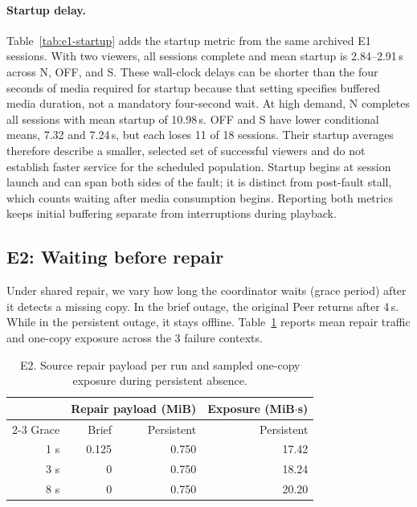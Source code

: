\paragraph{Startup delay.}

Table~\ref{tab:e1-startup} adds the startup metric from the same archived
E1 sessions. With two viewers, all sessions complete and mean startup is
2.84--2.91\,s across N, OFF, and S. These wall-clock delays can be shorter
than the four seconds of media required for startup because that setting
specifies buffered media duration, not a mandatory four-second wait.
At high demand, N completes all sessions with mean startup of 10.98\,s.
OFF and S have lower conditional means, 7.32 and 7.24\,s, but each loses
11 of 18 sessions. Their startup averages therefore describe a smaller,
selected set of successful viewers and do not establish faster service
for the scheduled population. Startup begins at session launch and can
span both sides of the fault; it is distinct from post-fault stall, which
counts waiting after media consumption begins. Reporting both metrics
keeps initial buffering separate from interruptions during playback.

\subsection{E2: Waiting before repair}
Under shared repair, we vary how long the coordinator waits (grace period) after it
detects a missing copy. In the brief outage, the original Peer returns
after 4\,s. While in the persistent outage, it stays offline.
Table~\ref{tab:e2} reports mean repair traffic and one-copy exposure
across the 3 failure contexts.

\begin{table}[ht]
\centering\small
\caption{E2. Source repair payload per run and sampled one-copy exposure
during persistent absence.}
\label{tab:e2}
\begin{tabular}{@{}r rr r@{}}
\toprule
 & \multicolumn{2}{c}{Repair payload (MiB)} & Exposure (MiB$\cdot$s) \\
\cmidrule(lr){2-3}
Grace & Brief & Persistent & Persistent \\
\midrule
1 s & 0.125 & 0.750 & 17.42 \\
3 s & 0 & 0.750 & 18.24 \\
8 s & 0 & 0.750 & 20.20 \\
\bottomrule
\end{tabular}
\end{table}

